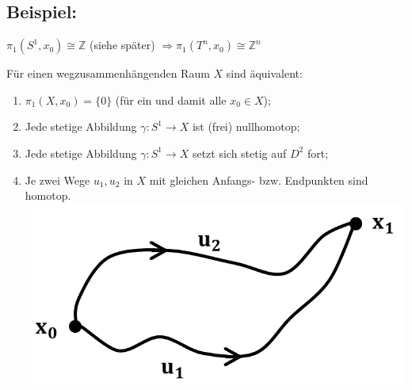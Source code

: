 \documentclass[a4paper,11pt,notitlepage]{report}
\theoremstyle{definition}
\newcommand{\Z}{{\ensuremath{\mathbb{Z}}}}
\newenvironment{bsp}[1]
{
\setlength{\fboxsep}{10pt}
\subsection*{Beispiel: #1}
\begin{upshape}
}
{
\end{upshape}
}
\begin{document}
\begin{bsp}{}
	$\pi_1(S^1,x_0) \cong \Z$ (siehe später) \newline
	$\Rightarrow \pi_1(T^n, x_0) \cong \Z^n$
\end{bsp}

\begin{theorem}
	Für einen wegzusammenhängenden Raum $X$ sind äquivalent:
	\begin{enumerate}
		\item $\pi_1(X,x_0) = \{0\}$ (für ein und damit alle $x_0 \in X$);
		\item Jede stetige Abbildung $\gamma \colon S^1 \rightarrow X$ ist (frei) nullhomotop;
		\item Jede stetige Abbildung $\gamma \colon S^1 \rightarrow X$ setzt sich stetig auf $D^2$ fort; %
		\item Je zwei Wege $u_1, u_2$ in $X$ mit gleichen Anfangs- bzw. Endpunkten sind homotop. \newline
		\includegraphics[scale=0.4]{images/Wege_homotop.png}
	\end{enumerate}
\end{theorem}
\end{document}
